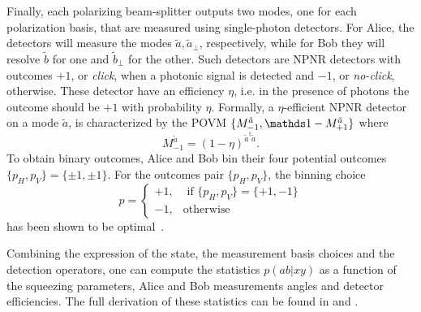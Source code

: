 Finally, each polarizing beam-splitter outputs two modes, one for each polarization basis, that are measured using single-photon detectors.
For Alice, the detectors will measure the modes $\tilde{a},\tilde{a}_\perp$, respectively, while for Bob they will resolve $\tilde{b}$ for one and $\tilde{b}_\perp$ for the other.
Such detectors are \acrfull{NPNR} detectors with outcomes $+1$, or \textit{click}, when a photonic signal is detected and $-1$, or \textit{no-click}, otherwise.
These detector have an efficiency $\eta$, i.e. in the presence of photons the outcome should be $+1$ with probability $\eta$.
Formally, a $\eta$-efficient NPNR detector on a mode $\tilde{a}$, is characterized by the POVM $\{M_{-1}^{\tilde{a}},\id-M_{+1}^{\tilde{a}}\}$ where
\begin{equation}
	M_{-1}^{\tilde{a}} = (1-\eta)^{\tilde{a}^\dag\tilde{a}}.
\end{equation}
To obtain binary outcomes, Alice and Bob bin their four potential outcomes $\{p_H,p_V\}=\{\pm1,\pm1\}$.
For the outcomes pair $\{p_H,p_V\}$, the binning choice
\begin{equation}
	p=\begin{cases}
		+1, &\text{ if } \{p_H,p_V\}=\{+1,-1\}\\
		-1, &\text{otherwise}
	\end{cases}
\end{equation}
has been shown to be optimal~\cite{Vivoli2015b}.

Combining the expression of the state, the measurement basis choices and the detection operators, one can compute the statistics $p(ab|xy)$ as a function of the squeezing parameters, Alice and Bob measurements angles and detector efficiencies.
The full derivation of these statistics can be found in \cite{Vivoli2015b} and \cite{Ho2020}.

\medbreak

